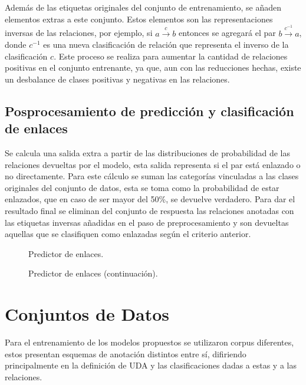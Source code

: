 \documentclass[a4paper,11pt,twocolumn,twoside]{article}
\begin{document}
Además de las etiquetas originales del conjunto de entrenamiento, se añaden elementos extras a este
conjunto. Estos elementos son las representaciones inversas de las relaciones, por ejemplo, si $a \xrightarrow{c} b$ entonces 
se agregará el par $b \xrightarrow{c^{-1}} a$, donde $c^{-1}$ es una nueva clasificación de relación que representa
el inverso de la clasificación $c$. Este proceso se realiza para aumentar la cantidad de relaciones positivas en el
conjunto entrenante, ya que, aun con las reducciones hechas, existe un desbalance de clases positivas y negativas en
las relaciones.

\subsection{Posprocesamiento de predicción y clasificación de enlaces}

Se calcula una salida extra a partir de las distribuciones de probabilidad de las relaciones 
devueltas por el modelo, esta salida representa si el par está enlazado o no directamente. Para este cálculo se 
suman las categorías vinculadas a las clases originales del conjunto de datos, esta se toma como la probabilidad de estar 
enlazados, que en caso de ser mayor del 50\%, se devuelve verdadero. Para dar el resultado final se eliminan del 
conjunto de respuesta las relaciones anotadas con las etiquetas inversas añadidas en el paso de preprocesamiento 
y son devueltas aquellas que se clasifiquen como enlazadas según el criterio anterior.

\begin{figure}[h]
	\centering
	
	\caption{Predictor de enlaces.}
	\label{fig:link_predictor_model1}
\end{figure}
\begin{figure}[h]
	\centering
	
	\caption{Predictor de enlaces (continuación).}
	\label{fig:link_predictor_model2}
\end{figure}

\section{Conjuntos de Datos}

Para el entrenamiento de los modelos propuestos se utilizaron corpus diferentes, estos
presentan esquemas de anotación distintos entre sí, difiriendo principalmente en la definición de UDA y 
las clasificaciones dadas a estas y a las relaciones.
\end{document}

